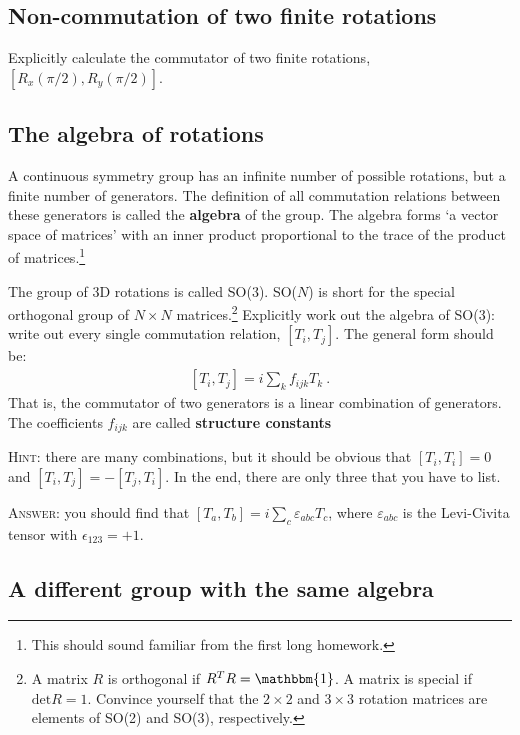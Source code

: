 \documentclass[12pt]{article}
\numberwithin{equation}{section}    %
\begin{document}
\subsection{Non-commutation of two finite rotations} 

Explicitly calculate the commutator of two finite rotations, $\left[R_x(\pi/2), R_y(\pi/2)\right]$. 

\subsection{The algebra of rotations}

A continuous symmetry group has an infinite number of possible rotations, but a finite number of generators. The definition of all commutation relations between these generators is called the \textbf{algebra} of the group. The algebra forms `a vector space of matrices' with an inner product proportional to the trace of the product of matrices.\footnote{This should sound familiar from the first long homework.} 

The group of 3D rotations is called SO(3). SO($N$) is short for the special orthogonal group of $N\times N$ matrices.\footnote{A matrix $R$ is orthogonal if $R^TR=\mathbbm{1}$. A matrix is special if $\text{det} R=1$. Convince yourself that the $2\times 2$ and $3\times 3$ rotation matrices are elements of SO(2) and SO(3), respectively.} Explicitly work out the algebra of SO(3): write out every single commutation relation, $[T_i, T_j]$. The general form should be:
\begin{align}
	\left[T_i, T_j\right] = i\sum_k f_{ijk} T_k \ .
\end{align}
That is, the commutator of two generators is a linear combination of generators. The coefficients $f_{ijk}$ are called \textbf{structure constants}


\textsc{Hint}: there are many combinations, but it should be obvious that $[T_i,T_i]=0$ and $[T_i,T_j]=-[T_j,T_i]$. In the end, there are only three that you have to list. 

\textsc{Answer}: you should find that $[T_a,T_b] = i\sum_c\varepsilon_{abc}T_c$, where $\varepsilon_{abc}$ is the Levi-Civita tensor with $\epsilon_{123} = +1$. 

\subsection{A different group with the same algebra}
\end{document}
